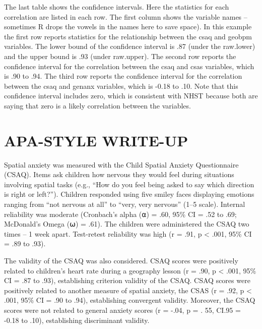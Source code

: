 \documentclass[
]{book}
\begin{document}
The last table shows the confidence intervals. Here the statistics for each correlation are listed in each row. The first column shows the variable names -- sometimes R drops the vowels in the names here to save space). In this example the first row reports statistics for the relationship between the csaq and geobpm variables. The lower bound of the confidence interval is .87 (under the raw.lower) and the upper bound is .93 (under raw.upper). The second row reports the confidence interval for the correlation between the csaq and csas variables, which is .90 to .94. The third row reports the confidence interval for the correlation between the csaq and genanx variables, which is -0.18 to .10. Note that this confidence interval includes zero, which is consistent with NHST because both are saying that zero is a likely correlation between the variables.

\hypertarget{apa-style-write-up}{%
\section{APA-STYLE WRITE-UP}\label{apa-style-write-up}}

Spatial anxiety was measured with the Child Spatial Anxiety Questionnaire (CSAQ). Items ask children how nervous they would feel during situations involving spatial tasks (e.g., ``How do you feel being asked to say which direction is right or left?''). Children responded using five smiley faces displaying emotions ranging from ``not nervous at all'' to ``very, very nervous'' (1--5 scale). Internal reliability was moderate (Cronbach's alpha (⍺) = .60, 95\% CI = .52 to .69; McDonald's Omega (⍵) = .61). The children were administered the CSAQ two times -- 1 week apart. Test-retest reliability was high (r = .91, p \textless{} .001, 95\% CI = .89 to .93).

The validity of the CSAQ was also considered. CSAQ scores were positively related to children's heart rate during a geography lesson (r = .90, p \textless{} .001, 95\% CI = .87 to .93), establishing criterion validity of the CSAQ. CSAQ scores were positively related to another measure of spatial anxiety, the CSAS (r = .92, p \textless{} .001, 95\% CI = .90 to .94), establishing convergent validity. Moreover, the CSAQ scores were not related to general anxiety scores (r = -.04, p = . 55, CI.95 = -0.18 to .10), establishing discriminant validity.

  
\end{document}
